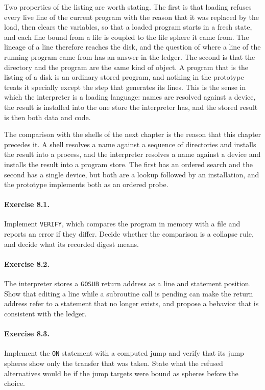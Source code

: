 \documentclass[11pt,oneside]{report}
\theoremstyle{plain}
\theoremstyle{definition}
\theoremstyle{remark}
\newcommand{\code}[2][Python]{}
\begin{document}
\code{ex_basic_load}

Two properties of the listing are worth stating. The first is that loading refuses every live line of the current program with the reason that it was replaced by the load, then clears the variables, so that a loaded program starts in a fresh state, and each line bound from a file is coupled to the file sphere it came from. The lineage of a line therefore reaches the disk, and the question of where a line of the running program came from has an answer in the ledger. The second is that the directory and the program are the same kind of object. A program that is the listing of a disk is an ordinary stored program, and nothing in the prototype treats it specially except the step that generates its lines. This is the sense in which the interpreter is a loading language: names are resolved against a device, the result is installed into the one store the interpreter has, and the stored result is then both data and code.

The comparison with the shells of the next chapter is the reason that this chapter precedes it. A shell resolves a name against a sequence of directories and installs the result into a process, and the interpreter resolves a name against a device and installs the result into a program store. The first has an ordered search and the second has a single device, but both are a lookup followed by an installation, and the prototype implements both as an ordered probe.

\paragraph{Exercise 8.1.} Implement \texttt{VERIFY}, which compares the program in memory with a file and reports an error if they differ. Decide whether the comparison is a collapse rule, and decide what its recorded digest means.

\paragraph{Exercise 8.2.} The interpreter stores a \texttt{GOSUB} return address as a line and statement position. Show that editing a line while a subroutine call is pending can make the return address refer to a statement that no longer exists, and propose a behavior that is consistent with the ledger.

\paragraph{Exercise 8.3.} Implement the \texttt{ON} statement with a computed jump and verify that its jump spheres show only the transfer that was taken. State what the refused alternatives would be if the jump targets were bound as spheres before the choice.
\end{document}
